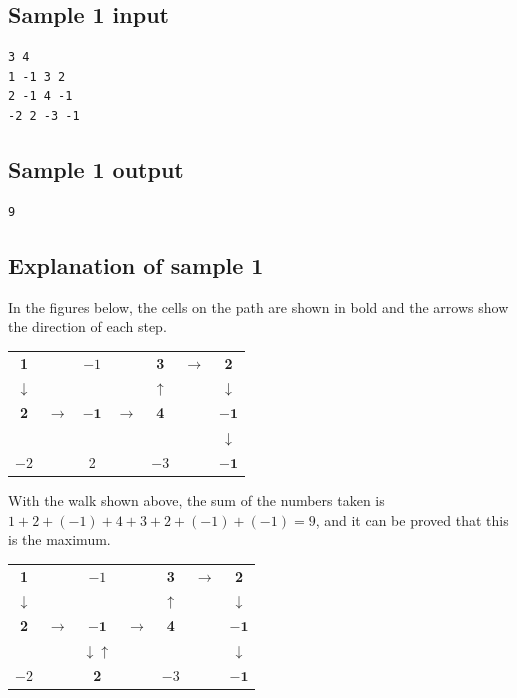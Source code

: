 \documentclass[11pt]{article}
\begin{document}
\subsection*{Sample 1 input}

\begin{verbatim}
3 4
1 -1 3 2
2 -1 4 -1
-2 2 -3 -1
\end{verbatim}

\subsection*{Sample 1 output}

\begin{verbatim}
9
\end{verbatim}

\subsection*{Explanation of sample 1}

In the figures below, the cells on the path are shown in bold and the
arrows show the direction of each step.

\begin{center}
\begin{tabular}{ccccccc}
\textbf{1} & & $-1$ & & \textbf{3} & $\rightarrow$ & \textbf{2} \\
$\downarrow$ & & & & $\uparrow$ & & $\downarrow$ \\
\textbf{2} & $\rightarrow$ & $\mathbf{-1}$ & $\rightarrow$ & \textbf{4}
  & & $\mathbf{-1}$ \\
 & & & & & & $\downarrow$ \\
$-2$ & & 2 & & $-3$ & & $\mathbf{-1}$ \\
\end{tabular}
\end{center}

With the walk shown above, the sum of the numbers taken is
$1 + 2 + (-1) + 4 + 3 + 2 + (-1) + (-1) = 9$,
and it can be proved that this is the maximum.

\begin{center}
\begin{tabular}{ccccccc}
\textbf{1} & & $-1$ & & \textbf{3} & $\rightarrow$ & \textbf{2} \\
$\downarrow$ & & & & $\uparrow$ & & $\downarrow$ \\
\textbf{2} & $\rightarrow$ & $\mathbf{-1}$ & $\rightarrow$ & \textbf{4}
  & & $\mathbf{-1}$ \\
 & & $\downarrow\uparrow$ & & & & $\downarrow$ \\
$-2$ & & \textbf{2} & & $-3$ & & $\mathbf{-1}$ \\
\end{tabular}
\end{center}
\end{document}
